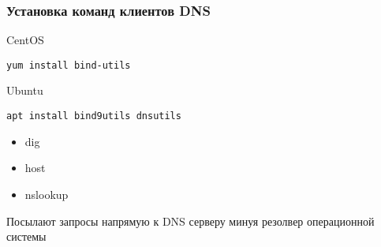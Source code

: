 \begin{frame}[fragile]
  \frametitle{Установка команд клиентов DNS}

CentOS
\begin{lstlisting}
yum install bind-utils
\end{lstlisting}

Ubuntu
\begin{lstlisting}
apt install bind9utils dnsutils
\end{lstlisting}
  
\begin{itemize}
  \item dig
  \item host
  \item nslookup
\end{itemize}

Посылают запросы напрямую к DNS серверу минуя резолвер операционной системы

\end{frame}
